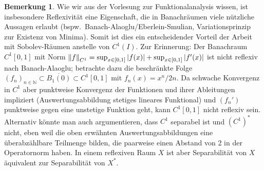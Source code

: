 \documentclass[twoside]{article}
\theoremstyle{definition}
\newtheorem{remark}[theorem]{Bemerkung}
\begin{document}
\begin{remark}
Wie wir aus der Vorlesung zur Funktionalanalysis wissen, ist insbesondere Reflexivität eine Eigenschaft, die in Banachräumen viele nützliche Aussagen erlaubt (bspw.\ Banach-Alaoglu/Eberlein-Smulian, Variationsprinzip zur Existenz von Minima). Somit ist dies ein entscheidender Vorteil der Arbeit mit Sobolev-Räumen anstelle von $C^1(I)$. Zur Erinnerung: Der Banachraum $C^1[0,1]$ mit Norm $\norm{f}_{C^1} = \sup_{x \in [0,1]} \abs{f(x)} + \sup_{x \in [0,1]} \abs{f'(x)} $ ist nicht reflexiv nach Banach-Alaoglu; betrachte dazu die beschränkte Folge $(f_n)_{n \in \mathbb{N}} \subset \overline{B_1(0)} \subset C^1[0,1]$ mit $f_n(x) = x^n/2n$. Da schwache Konvergenz in $C^1$ aber punktweise Konvergenz der Funktionen und ihrer Ableitungen impliziert (Auswertungsabbildung stetiges lineares Funktional) und $(f_n')$ punktweise gegen eine unstetige Funktion geht, kann $C^1[0,1]$ nicht reflexiv sein. Alternativ könnte man auch argumentieren, dass $C^1$ separabel ist und $(C^1)^*$ nicht, eben weil die oben erwähnten Auswertungsabbildungen eine überabzählbare Teilmenge bilden, die paarweise einen Abstand von 2 in der Operatornorm haben. In einem reflexiven Raum $X$ ist aber Separabilität von $X$ äquivalent zur Separabilität von $X^*$.
\end{remark}
\end{document}
